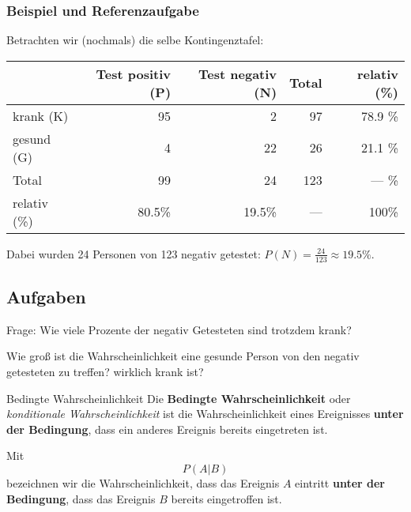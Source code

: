 \newpage

\subsubsection{Beispiel und Referenzaufgabe}
Betrachten wir (nochmals) die selbe Kontingenztafel:

  \begin{tabular}{|l|r|r|r|r|}\hline
                 & Test positiv (P) & Test negativ (N)& Total & relativ (\%) \\\hline
    krank (K)    & 95               & 2               & 97    & 78.9 \%      \\\hline    
    gesund (G)   & 4                & 22              & 26    & 21.1 \%      \\\hline
    Total        & 99               & 24              & 123   &  --- \%      \\\hline
    relativ (\%) & 80.5\%           &19.5\%           & ---   &   100\%      \\\hline
  \end{tabular}

  
Dabei wurden 24 Personen von 123 negativ getestet: $P(N) =\frac{24}{123}\approx 19.5\%$.


\subsection*{Aufgaben}

Frage: Wie viele Prozente der negativ Getesteten sind trotzdem krank?




Wie groß ist die Wahrscheinlichkeit eine gesunde Person von den negativ getesteten zu treffen?
wirklich krank ist?
\newpage





\begin{definition}{Bedingte Wahrscheinlichkeit}{}
Die \textbf{Bedingte Wahrscheinlichkeit} oder \textit{konditionale
  Wahrscheinlichkeit} ist die Wahrscheinlichkeit eines Ereignisses
\textbf{unter der Bedingung}, dass ein anderes Ereignis bereits
eingetreten ist.

  Mit
  $$P(A | B)$$
  bezeichnen wir die Wahrscheinlichkeit, dass das Ereignis $A$
  eintritt \textbf{unter der Bedingung}, dass das Ereignis $B$ bereits
  eingetroffen ist.
\end{definition}

